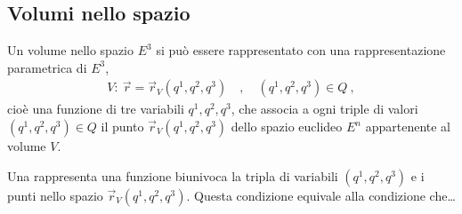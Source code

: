 \documentclass[letterpaper,10pt,italian]{jupyterBook}
\begin{document}
\subsection{Volumi nello spazio}
\label{\detokenize{ch/vector-calculus/geometry:volumi-nello-spazio}}\label{\detokenize{ch/vector-calculus/geometry:vector-calculus-geometry-volumes}}
\sphinxAtStartPar
Un volume nello spazio \(E^3\) si può essere rappresentato con una rappresentazione parametrica di \(E^3\),
\begin{equation*}
\begin{split}V: \ \vec{r} = \vec{r}_V(q^1, q^2, q^3) \quad , \quad (q^1, q^2, q^3) \in Q \ ,\end{split}
\end{equation*}
\sphinxAtStartPar
cioè una funzione di tre variabili \(q^1, q^2, q^3\), che associa a ogni triple di valori \((q^1, q^2, q^3) \in Q\) il punto \(\vec{r}_V(q^1, q^2, q^3)\) dello spazio euclideo \(E^n\) appartenente al volume \(V\).

\sphinxAtStartPar
Una  rappresenta una funzione biunivoca la tripla di variabili \((q^1, q^2, q^3)\) e i punti nello spazio \(\vec{r}_{V}(q^1, q^2, q^3)\). Questa condizione equivale alla condizione che…
\end{document}
